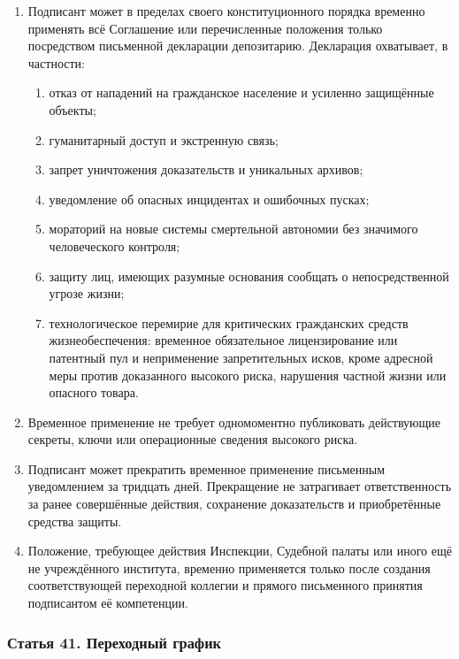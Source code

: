 \documentclass[
  russian,
  11pt,
  a4paper,
]{article}
\providecommand{\tightlist}{%
  \setlength{\itemsep}{0pt}\setlength{\parskip}{0pt}}
\begin{document}
\begin{enumerate}
\def\labelenumi{\arabic{enumi}.}
\tightlist
\item
  Подписант может в пределах своего конституционного порядка временно
  применять всё Соглашение или перечисленные положения только
  посредством письменной декларации депозитарию. Декларация охватывает,
  в частности:

  \begin{enumerate}
  \def\labelenumii{\arabic{enumii}.}
  \tightlist
  \item
    отказ от нападений на гражданское население и усиленно защищённые
    объекты;
  \item
    гуманитарный доступ и экстренную связь;
  \item
    запрет уничтожения доказательств и уникальных архивов;
  \item
    уведомление об опасных инцидентах и ошибочных пусках;
  \item
    мораторий на новые системы смертельной автономии без значимого
    человеческого контроля;
  \item
    защиту лиц, имеющих разумные основания сообщать о непосредственной
    угрозе жизни;
  \item
    технологическое перемирие для критических гражданских средств
    жизнеобеспечения: временное обязательное лицензирование или
    патентный пул и неприменение запретительных исков, кроме адресной
    меры против доказанного высокого риска, нарушения частной жизни или
    опасного товара.
  \end{enumerate}
\item
  Временное применение не требует одномоментно публиковать действующие
  секреты, ключи или операционные сведения высокого риска.
\item
  Подписант может прекратить временное применение письменным
  уведомлением за тридцать дней. Прекращение не затрагивает
  ответственность за ранее совершённые действия, сохранение
  доказательств и приобретённые средства защиты.
\item
  Положение, требующее действия Инспекции, Судебной палаты или иного ещё
  не учреждённого института, временно применяется только после создания
  соответствующей переходной коллегии и прямого письменного принятия
  подписантом её компетенции.
\end{enumerate}

\subsubsection{Статья 41. Переходный
график}\label{ux441ux442ux430ux442ux44cux44f-41-ux43fux435ux440ux435ux445ux43eux434ux43dux44bux439-ux433ux440ux430ux444ux438ux43a}
\end{document}
